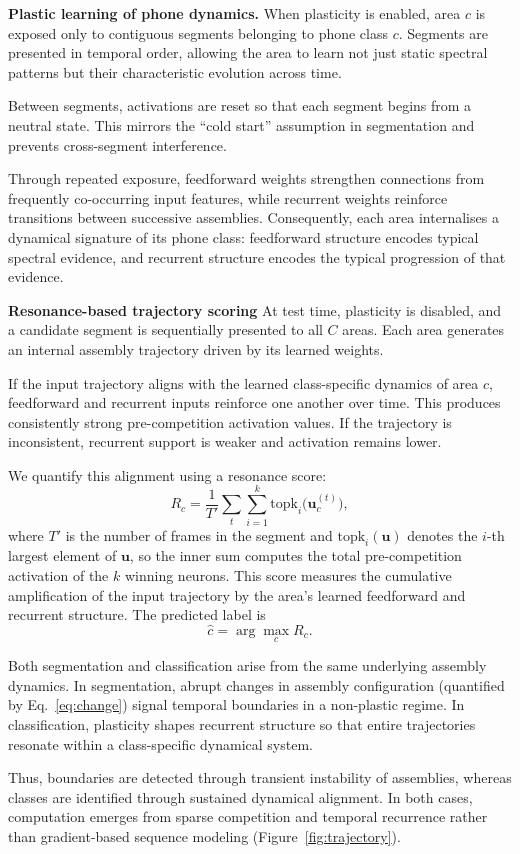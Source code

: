 \noindent\textbf{Plastic learning of phone dynamics.}
When plasticity is enabled, area $c$ is exposed only to contiguous segments belonging to phone class $c$. Segments are presented in temporal order, allowing the area to learn not just static spectral patterns but their characteristic evolution across time.

Between segments, activations are reset so that each segment begins from a neutral state. This mirrors the ``cold start'' assumption in segmentation and prevents cross-segment interference.

Through repeated exposure, feedforward weights strengthen connections from frequently co-occurring input features, while recurrent weights reinforce transitions between successive assemblies. Consequently, each area internalises a dynamical signature of its phone class: feedforward structure encodes typical spectral evidence, and recurrent structure encodes the typical progression of that evidence.

\noindent\textbf{Resonance-based trajectory scoring}
\label{sec:traj_scoring}
At test time, plasticity is disabled, and a candidate segment is sequentially presented to all $C$ areas. Each area generates an internal assembly trajectory driven by its learned weights.

If the input trajectory aligns with the learned class-specific dynamics of area $c$, feedforward and recurrent inputs reinforce one another over time. This produces consistently strong pre-competition activation values. If the trajectory is inconsistent, recurrent support is weaker and activation remains lower.


We quantify this alignment using a resonance score:
\begin{equation}\label{eq:resonance}
    R_c = \frac{1}{T'}
    \sum_{t}
    \sum_{i=1}^{k}
    \mathrm{topk}_i\bigl(\mathbf{u}_c^{(t)}\bigr),
\end{equation}
where $T'$ is the number of frames in the segment and $\mathrm{topk}_i(\mathbf{u})$ denotes the $i$-th largest element of $\mathbf{u}$, so the inner sum computes the total pre-competition activation of the $k$ winning neurons. This score measures the cumulative amplification of the input trajectory by the area's learned feedforward and recurrent structure. 
The predicted label is
\begin{equation}
    \hat{c} = \arg\max_c R_c.
\end{equation}

Both segmentation and classification arise from the same underlying assembly dynamics. In segmentation, abrupt changes in assembly configuration (quantified by Eq.~\ref{eq:change}) signal temporal boundaries in a non-plastic regime. In classification, plasticity shapes recurrent structure so that entire trajectories resonate within a class-specific dynamical system. 

Thus, boundaries are detected through transient instability of assemblies, whereas classes are identified through sustained dynamical alignment. In both cases, computation emerges from sparse competition and temporal recurrence rather than gradient-based sequence modeling (Figure~\ref{fig:trajectory}).
